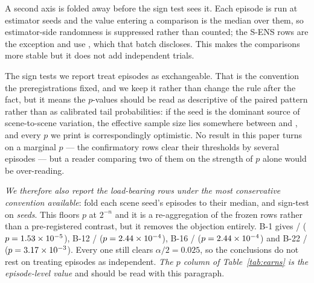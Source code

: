 \documentclass[review]{elsarticle}
\begin{document}
A second axis is folded away before the sign test sees it. Each episode is run at
\EstSeeds{} estimator seeds and the value entering a comparison is the median over
them, so estimator-side randomness is suppressed rather than counted; the S-ENS rows
are the exception and use \EstSeedsSEns{}, which that batch discloses. This makes the
comparisons more stable but it does not add independent trials.

The sign tests we report treat episodes as exchangeable. That is the convention the
preregistrations fixed, and we keep it rather than change the rule after the fact,
but it means the $p$-values should be read as descriptive of the paired pattern
rather than as calibrated tail probabilities: if the seed is the dominant source of
scene-to-scene variation, the effective sample size lies somewhere between
\AblationSeeds{} and \AblationEps{}, and every $p$ we print is correspondingly
optimistic. No result in this paper turns on a marginal $p$ --- the confirmatory
rows clear their thresholds by several episodes --- but a reader comparing two of
them on the strength of $p$ alone would be over-reading.

\emph{We therefore also report the load-bearing rows under the most conservative
convention available}: fold each scene seed's episodes to their median, and sign-test
on \emph{seeds}. This floors $p$ at $2^{-n}$ and it is a re-aggregation of the frozen
rows rather than a pre-registered contrast, but it removes the objection entirely.
B-1 gives \BOneSeedW{}/\BOneSeedN{} ($p = 1.53\times 10^{-5}{}$), B-12
\BTwelveSeedW{}/\BTwelveSeedN{} ($p = 2.44\times 10^{-4}{}$), B-16
\BSixteenSeedW{}/\BSixteenSeedN{} ($p = 2.44\times 10^{-4}{}$) and B-22
\BTwentyTwoSeedW{}/\BTwentyTwoSeedN{} ($p = 3.17\times 10^{-3}{}$). Every one still
clears $\alpha/2 = 0.025$, so the conclusions do not rest on treating episodes as
independent. \emph{The $p$ column of Table~\ref{tab:earns} is the episode-level
value} and should be read with this paragraph.
\end{document}
